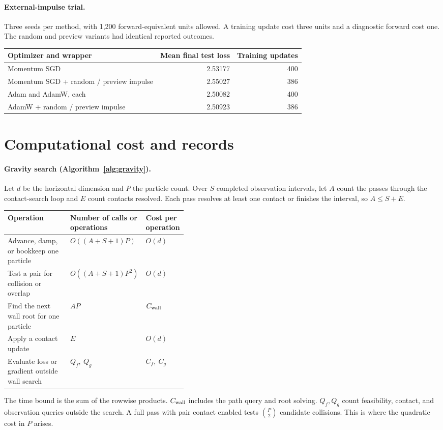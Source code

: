 \documentclass[10pt,letterpaper]{article}
\begin{document}
\paragraph{External-impulse trial.}
Three seeds per method, with 1,200 forward-equivalent units allowed. A training update cost three units and a diagnostic forward cost one. The random and preview variants had identical reported outcomes.
\begin{center}
\small
\begin{tabular}{@{}lrr@{}}
\toprule
Optimizer and wrapper & Mean final test loss & Training updates\\
\midrule
Momentum SGD & 2.53177 & 400\\
Momentum SGD + random / preview impulse & 2.55027 & 386\\
Adam and AdamW, each & 2.50082 & 400\\
AdamW + random / preview impulse & 2.50923 & 386\\
\bottomrule
\end{tabular}
\end{center}
\section{Computational cost and records}
\label{app:algorithms}

\paragraph{Gravity search (Algorithm~\ref{alg:gravity}).}
Let \(d\) be the horizontal dimension and \(P\) the particle count. Over \(S\) completed observation intervals, let \(A\) count the passes through the contact-search loop and \(E\) count contacts resolved. Each pass resolves at least one contact or finishes the interval, so \(A\le S+E\).

\begin{center}
\small
\begin{tabular}{@{}p{0.41\linewidth}ll@{}}
\toprule
Operation & Number of calls or operations & Cost per operation\\
\midrule
Advance, damp, or bookkeep one particle & \(O((A+S+1)P)\) & \(O(d)\)\\
Test a pair for collision or overlap & \(O((A+S+1)P^2)\) & \(O(d)\)\\
Find the next wall root for one particle & \(AP\) & \(C_{\rm wall}\)\\
Apply a contact update & \(E\) & \(O(d)\)\\
Evaluate loss or gradient outside wall search & \(Q_f,\ Q_g\) & \(C_f,\ C_g\)\\
\bottomrule
\end{tabular}
\end{center}
The time bound is the sum of the rowwise products. \(C_{\rm wall}\) includes the path query and root solving. \(Q_f,Q_g\) count feasibility, contact, and observation queries outside the search. A full pass with pair contact enabled tests \(\binom{P}{2}\) candidate collisions. This is where the quadratic cost in \(P\) arises.
\end{document}
